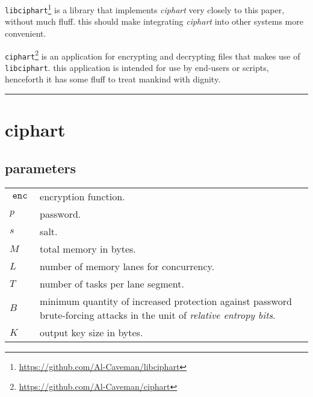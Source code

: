 \documentclass[twocolumn]{article}
\DeclareMathOperator{\enc}{\texttt{enc}}
\begin{document}
\texttt{libciphart}\footnote{\url{https://github.com/Al-Caveman/libciphart}}
is a library that implements \emph{ciphart} very closely to this paper,
without much fluff.  this should make integrating \emph{ciphart} into other
systems more convenient.

\texttt{ciphart}\footnote{\url{https://github.com/Al-Caveman/ciphart}} is
an application for encrypting and decrypting files that makes use of
\texttt{libciphart}.  this application is intended for use by end-users or
scripts, henceforth it has some fluff to treat mankind with dignity.

\tableofcontents
\noindent
\rule{1\columnwidth}{2pt}

\section{ciphart}
\subsection{parameters}
\begin{tabularx}{\columnwidth}{lX}
    $\enc$ & encryption function.\\
    $p$ & password.\\
    $s$ & salt.\\
    $M$ & total memory in bytes.\\
    $L$ & number of memory lanes for concurrency.\\
    $T$ & number of tasks per lane segment.\\
    $B$ & minimum quantity of increased protection against password
            brute-forcing attacks in the unit of \emph{relative entropy
            bits}.\\
    $K$ & output key size in bytes.\\
\end{tabularx}
\end{document}

